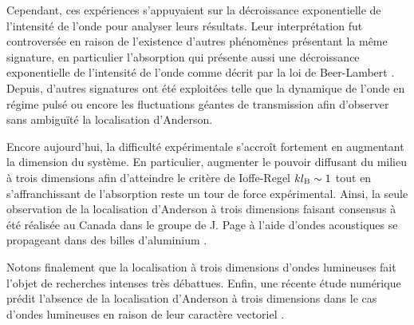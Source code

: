 Cependant, ces expériences s'appuyaient sur la décroissance exponentielle de l'intensité de l'onde pour analyser leurs résultats. Leur interprétation fut controversée en raison de l'existence d'autres phénomènes présentant la même signature, en particulier l'absorption qui présente aussi une décroissance exponentielle de l'intensité de l'onde comme décrit par la loi de Beer-Lambert \citep{scheffold1999localization}. Depuis, d'autres signatures ont été exploitées telle que la dynamique de l'onde en régime pulsé \citep{weaver1993anomalous} ou encore les fluctuations géantes de transmission \citep{nieuwenhuizen1995intensity} afin d'observer sans ambiguïté la localisation d'Anderson.

Encore aujourd'hui, la difficulté expérimentale s'accroît fortement en augmentant la dimension du système. En particulier, augmenter le pouvoir diffusant du milieu à trois dimensions afin d'atteindre le critère de Ioffe-Regel $k l_{\mathrm{B}} \sim 1$ tout en s'affranchissant de l'absorption reste un tour de force expérimental. Ainsi, la seule observation de la localisation d'Anderson à trois dimensions faisant consensus à été réalisée au Canada dans le groupe de J. Page à l'aide d'ondes acoustiques se propageant dans des billes d'aluminium \citep{hu2008localization}.

Notons finalement que la localisation à trois dimensions d'ondes lumineuses fait l'objet de recherches intenses très débattues. Enfin, une récente étude numérique prédit l'absence de la localisation d'Anderson à trois dimensions dans le cas d'ondes lumineuses en raison de leur caractère vectoriel \citep{skipetrov2014absence}.





